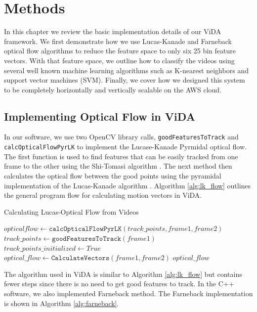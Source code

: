\chapter{Methods}
In this chapter we review the basic implementation details of our ViDA
framework. We first demonstrate how we use Lucas-Kanade and Farneback optical
flow algorithms to reduce the feature space to only six 25 bin feature vectors.
With that feature space, we outline how to classify the videos using several
well known machine learning algorithms such as K-nearest neighbors and support
vector machines (SVM). Finally, we cover how we designed this system to be
completely horizontally and vertically scalable on the AWS cloud.


\section{\label{section:vida_oflow} Implementing Optical Flow in ViDA}
In our software, we use two OpenCV library calls, \texttt{goodFeaturesToTrack}
and \\
\texttt{calcOpticalFlowPyrLK} to implement the Lucase-Kanade Pyrmidal optical
flow. The first function is used to find features that can be easily tracked
from one frame to the other using the Shi-Tomasi algorithm \cite{shi1994good}.
The next method then calculates the optical flow between the good points using
the pyramidal implementation of the Lucas-Kanade algorithm
\cite{bouguet2001pyramidal}. Algorithm \ref{alg:lk_flow} outlines the general
program flow for calculating motion vectors in ViDA.

\begin{algorithm}
\caption{Calculating Lucas-Optical Flow from Videos}
\label{alg:lk_flow}
\begin{algorithmic}[1]
  	\State $opticalflow \gets \texttt{calcOpticalFlowPyrLK}(track\_points, frame1, frame2)$
  \Else
  	\State $track\_points \gets \texttt{goodFeaturesToTrack}(frame1)$
	\State $track\_points\_initialized \gets True$
	\State $optical\_flow \gets  \texttt{CalculateVectors}(frame1, frame2)$
  \EndIf
  \Return $optical\_flow$
\EndProcedure
\end{algorithmic}
\end{algorithm}

The algorithm used in ViDA is similar to Algorithm \ref{alg:lk_flow} but
contains fewer steps since there is no need to get good features to track.
In the C++ software, we also implemented Farneback method. The
Farneback implementation is shown in Algorithm \ref{alg:farneback}.

